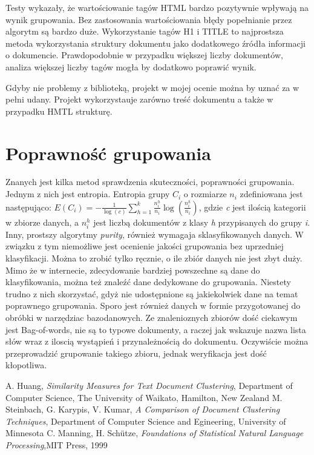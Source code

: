 \documentclass{article}
\begin{document}
Testy wykazały, że wartościowanie tagów HTML bardzo pozytywnie wpływają na wynik grupowania. Bez zastosowania wartościowania błędy popełnianie przez algorytm są bardzo duże. Wykorzystanie tagów H1 i TITLE to najprostsza metoda wykorzystania struktury dokumentu jako dodatkowego źródła informacji o dokumencie. Prawdopodobnie w przypadku większej liczby dokumentów, analiza większej liczby tagów mogła by dodatkowo poprawić wynik.


Gdyby nie problemy z biblioteką, projekt w mojej ocenie można by uznać za w pełni udany. Projekt wykorzystauje zarówno treść dokumentu a także w przypadku HMTL strukturę. 

\section{Poprawność grupowania}
Znanych jest kilka metod sprawdzenia skuteczności, poprawności grupowania. Jednym z nich jest entropia. Entropia grupy \( C_{i} \) o rozmiarze \( n_{i} \) zdefiniowana jest następująco:
\( E(C_{i}) = -\frac{1}{\log(c)}\sum_{h=1}^{k}\frac{n_i^h}{n_i}\log(\frac{n_i^h}{n_i}) \), gdzie \emph{c} jest ilością kategorii w zbiorze danych, a \( n_i^h  \) jest liczbą dokumentów z klasy \emph{h} przypisanych do grupy \emph{i}. Inny, prostszy algorytmy \emph{purity}, również wymagaja sklasyfikowanych danych. W związku z tym niemożliwe jest ocenienie jakości grupowania bez uprzedniej klasyfikacji. Można to zrobić tylko ręcznie, o ile zbiór danych nie jest zbyt duży.
Mimo że w internecie, zdecydowanie bardziej powszechne są dane do klasyfikowania, można też znaleźć dane dedykowane do grupowania. Niestety trudno z nich skorzystać, gdyż nie udostępnione są jakiekolwiek dane na temat poprawnego grupowania. Sporo jest również danych w formie przygotowanej do obróbki w narzędziac bazodanowych. 
Ze znalenioznych zbiorów dość ciekawym jest Bag-of-words, nie są to typowe dokumenty, a raczej jak wskazuje nazwa lista słów wraz z iloscią wystąpień i przynależnością do dokumentu. Oczywiście można przeprowadzić grupowanie takiego zbioru, jednak weryfikacja jest dość kłopotliwa.

\begin{thebibliography}{9}
A. Huang, \emph{Similarity Measures for Text Document Clustering}, Department of Computer Science, The University of Waikato, Hamilton, New Zealand
M. Steinbach, G. Karypis, V. Kumar, \emph{A Comparison of Document Clustering Techniques}, Department of Computer Science and Egineering, University of Minnesota
C. Manning, H. Schütze, \emph{Foundations of Statistical Natural Language Processing},MIT Press, 1999
\end{thebibliography}
\end{document}
